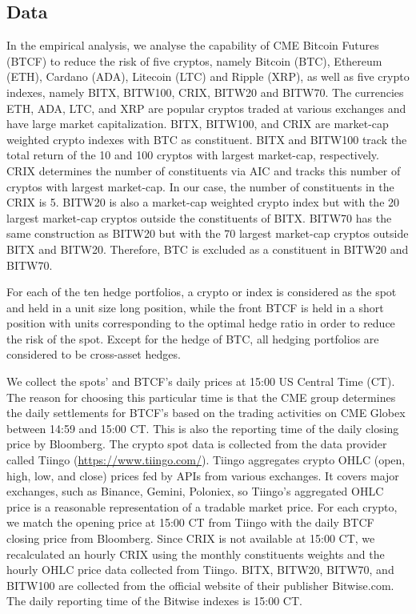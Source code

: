 \subsection{Data}\label{subsec:data}
In the empirical analysis, we analyse the capability 
of CME Bitcoin Futures (BTCF) to reduce the risk of
five cryptos, namely Bitcoin (BTC), Ethereum 
(ETH), Cardano (ADA), Litecoin (LTC) and Ripple (XRP), as well as five
crypto indexes, namely BITX, BITW100, CRIX, BITW20 and BITW70.
The currencies ETH, ADA, LTC, and XRP are popular cryptos traded at
various exchanges and have large market capitalization. 
BITX, BITW100, and CRIX are market-cap weighted crypto indexes with
BTC as constituent. 
BITX and BITW100 track the total return of the 10 and 100 cryptos
with largest market-cap, respectively. 
CRIX determines the number of constituents via AIC and tracks this
number of cryptos with largest market-cap. In our case, the number of
constituents in the CRIX is 5. 
BITW20 is also a market-cap weighted crypto index but with the 20
largest market-cap cryptos outside the constituents of BITX.
BITW70 has the same construction as BITW20 but with the 70 largest
market-cap cryptos outside BITX and BITW20. 
Therefore, BTC is excluded as a constituent in BITW20 and BITW70.

For each of the ten hedge portfolios, a crypto or index is considered
as the spot and held in a unit size long position, while 
the front BTCF is held in a short position with units corresponding to
the optimal hedge ratio in order to reduce the risk of the spot. 
Except for the hedge of BTC, all hedging portfolios are considered to
be cross-asset hedges. 


We collect the spots' and BTCF's daily prices at 15:00 US Central Time
(CT). The reason for choosing this particular time is that the CME
group determines the daily settlements for BTCF's based on the trading
activities on CME Globex between 14:59 and 15:00 CT. This is also the
reporting time of the daily closing price by Bloomberg. 
The crypto spot data is collected from the data provider called
Tiingo (\href{https://www.tiingo.com/}{https://www.tiingo.com/}).
Tiingo aggregates crypto OHLC (open, high, low, and close) prices fed
by APIs from various exchanges. It covers major exchanges, such as
Binance, Gemini, Poloniex, so Tiingo's aggregated OHLC price is a
reasonable representation of a tradable market price. 
For each crypto, we match the opening price at 15:00 CT from Tiingo
with the daily BTCF closing price from Bloomberg.
Since CRIX is not available at 15:00 CT, we recalculated an hourly
CRIX using the monthly constituents weights and the hourly OHLC price
data collected from Tiingo. 
BITX, BITW20, BITW70, and BITW100 are collected from the official
website of their publisher Bitwise.com. 
The daily reporting time of the Bitwise indexes is 15:00 CT.


